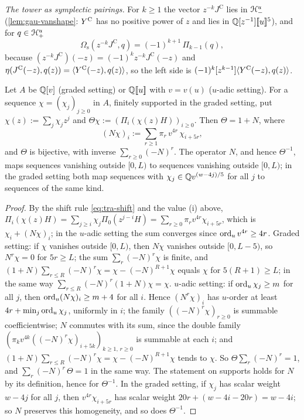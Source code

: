 \emph{The tower as symplectic pairings.} For $k\geq 1$ the vector $z^{-k}J^{\mathrm C}$ lies in $\mathcal{H}^u_-$ (\cref{lem:gau-vanshape}: $Y^{\mathrm{C}}$ has no positive power of $z$ and lies in $\mathbb{Q}[z^{-1}][\![ u ]\!]^5$), and for $q\in\mathcal{H}^u_+$
\begin{equation}
\label{eq:tra-pairing}
\Omega_{\mathrm s}(z^{-k}J^{\mathrm C},q) = (-1)^{k+1}\,\Pi_{k-1}(q),
\end{equation}
because $(z^{-k}J^{\mathrm C})(-z) = (-1)^kz^{-k}J^{\mathrm C}(-z)$ and $\eta(J^{\mathrm C}(-z),q(z)) = \langle Y^{\mathrm{C}}(-z),q(z)\rangle$, so the left side is $(-1)^k[z^{k-1}]\langle Y^{\mathrm{C}}(-z),q(z)\rangle$.

\begin{lem}
\label{lem:tra-theta}
Let $A$ be $\mathbb{Q}[v]$ (graded setting) or $\mathbb{Q}[\![ u ]\!]$ with $v = v(u)$ ($u$-adic setting). For a sequence $\chi = (\chi_j)_{j\geq 0}$ in $A$, finitely supported in the graded setting, put $\chi(z) := \sum_j\chi_jz^j$ and $\Theta\chi := (\Pi_i(\chi(z)H))_{i\geq 0}$. Then $\Theta = 1+N$, where
\[
(N\chi)_i := \sum_{r\geq 1}\pi_r\,v^{4r}\,\chi_{i+5r},
\]
and $\Theta$ is bijective, with inverse $\sum_{r\geq 0}(-N)^r$. The operator $N$, and hence $\Theta^{-1}$, maps sequences vanishing outside $[0,L)$ to sequences vanishing outside $[0,L)$; in the graded setting both map sequences with $\chi_j\in\mathbb{Q} v^{(w-4j)/5}$ for all $j$ to sequences of the same kind.
\end{lem}

\begin{proof}
By the shift rule \eqref{eq:tra-shift} and the value (i) above, $\Pi_i(\chi(z)H) =\sum_{j\geq i}\chi_j\Pi_0(z^{j-i}H) = \sum_{r\geq 0}\pi_rv^{4r}\chi_{i+5r}$, which is $\chi_i+(N\chi)_i$; in the $u$-adic setting the sum converges since $\operatorname{ord}_uv^{4r}\geq 4r$. Graded setting: if $\chi$ vanishes outside $[0,L)$, then $N\chi$ vanishes outside $[0,L-5)$, so $N^r\chi = 0$ for $5r\geq L$; the sum $\sum_r(-N)^r\chi$ is finite, and $(1+N)\sum_{r\leq R}(-N)^r\chi = \chi-(-N)^{R+1}\chi$ equals $\chi$ for $5(R+1)\geq L$; in the same way $\sum_{r\leq R}(-N)^r(1+N)\chi = \chi$. $u$-adic setting: if $\operatorname{ord}_u\chi_j\geq m$ for all $j$, then $\operatorname{ord}_u(N\chi)_i\geq m+4$ for all $i$. Hence $(N^r\chi)_i$ has $u$-order at least $4r+\min_j\operatorname{ord}_u\chi_j$, uniformly in $i$; the family $((-N)^r\chi)_{r\geq 0}$ is summable coefficientwise; $N$ commutes with its sum, since the double family $(\pi_kv^{4k}((-N)^r\chi)_{i+5k})_{k\geq 1,\,r\geq 0}$ is summable at each $i$; and $(1+N)\sum_{r\leq R}(-N)^r\chi = \chi-(-N)^{R+1}\chi$ tends to $\chi$. So $\Theta\sum_r(-N)^r = 1$, and $\sum_r(-N)^r\,\Theta = 1$ in the same way. The statement on supports holds for $N$ by its definition, hence for $\Theta^{-1}$. In the graded setting, if $\chi_j$ has scalar weight $w-4j$ for all $j$, then $v^{4r}\chi_{i+5r}$ has scalar weight $20r+(w-4i-20r) = w-4i$; so $N$ preserves this homogeneity, and so does $\Theta^{-1}$.
\end{proof}

